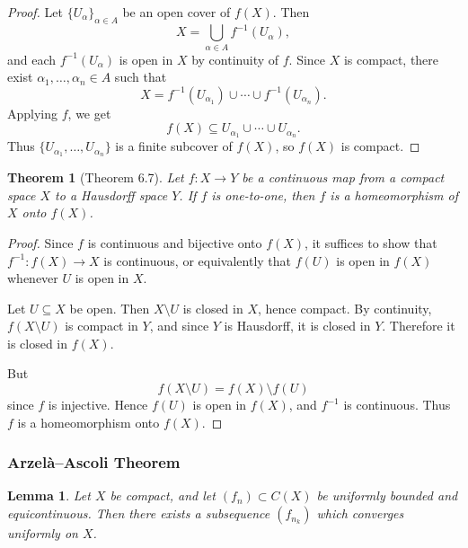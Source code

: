\documentclass[12pt]{article}
\newtheorem{theorem}{Theorem}
\newtheorem{lemma}{Lemma}
\begin{document}
\begin{proof}
Let $\{U_\alpha\}_{\alpha\in A}$ be an open cover of $f(X)$. Then
\[
X=\bigcup_{\alpha\in A} f^{-1}(U_\alpha),
\]
and each $f^{-1}(U_\alpha)$ is open in $X$ by continuity of $f$. Since $X$ is compact, there exist $\alpha_1,\dots,\alpha_n\in A$ such that
\[
X=f^{-1}(U_{\alpha_1})\cup\cdots\cup f^{-1}(U_{\alpha_n}).
\]
Applying $f$, we get
\[
f(X)\subseteq U_{\alpha_1}\cup\cdots\cup U_{\alpha_n}.
\]
Thus $\{U_{\alpha_1},\dots,U_{\alpha_n}\}$ is a finite subcover of $f(X)$, so $f(X)$ is compact.
\end{proof}

\begin{theorem}[Theorem 6.7]
Let $f:X \to Y$ be a continuous map from a compact space $X$ to a Hausdorff space $Y$. If $f$ is one-to-one, then $f$ is a homeomorphism of $X$ onto $f(X)$.
\end{theorem}

\begin{proof}
Since $f$ is continuous and bijective onto $f(X)$, it suffices to show that $f^{-1}:f(X)\to X$ is continuous, or equivalently that $f(U)$ is open in $f(X)$ whenever $U$ is open in $X$.

Let $U\subseteq X$ be open. Then $X\setminus U$ is closed in $X$, hence compact. By continuity, $f(X\setminus U)$ is compact in $Y$, and since $Y$ is Hausdorff, it is closed in $Y$. Therefore it is closed in $f(X)$.

But
\[
f(X\setminus U) = f(X)\setminus f(U)
\]
since $f$ is injective. Hence $f(U)$ is open in $f(X)$, and $f^{-1}$ is continuous. Thus $f$ is a homeomorphism onto $f(X)$.
\end{proof}

\subsubsection*{Arzelà--Ascoli Theorem}

\begin{lemma}
Let $X$ be compact, and let $(f_n)\subset C(X)$ be uniformly bounded and equicontinuous.
Then there exists a subsequence $(f_{n_k})$ which converges uniformly on $X$.
\end{lemma}
\end{document}
